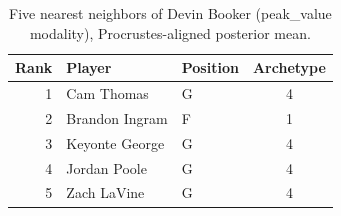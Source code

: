 \begin{table}[htbp]
  \centering\small
  \begin{tabular}{rllc}
    \toprule
    Rank & Player & Position & Archetype \\
    \midrule
    1 & Cam Thomas & G & 4 \\
    2 & Brandon Ingram & F & 1 \\
    3 & Keyonte George & G & 4 \\
    4 & Jordan Poole & G & 4 \\
    5 & Zach LaVine & G & 4 \\
    \bottomrule
  \end{tabular}
  \caption{Five nearest neighbors of Devin Booker (peak_value modality), Procrustes-aligned posterior mean.}
  \label{tab:Devin_Booker_neighbors_peak_value}
\end{table}


